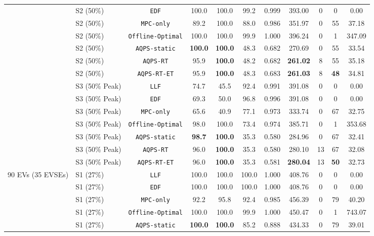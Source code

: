 \documentclass[final,3p,times,twocolumn]{elsarticle}
\begin{document}
\begin{table}[htbp]
\begin{tabular}{llccccccccc}
 & S2 (50\%) & \texttt{EDF}             & 100.0 & 100.0 & 99.2  & 0.999 & 393.00 & 0  & 0  & 0.00  \\
 & S2 (50\%) & \texttt{MPC-only}        & 89.2  & 100.0 & 88.0  & 0.986 & 351.97 & 0  & 55 & 37.18 \\
 & S2 (50\%) & \texttt{Offline-Optimal} & 100.0 & 100.0 & 99.9  & 1.000 & 396.24 & 0  & 1  & 347.09 \\
 & S2 (50\%) & \texttt{AQPS-static}     & \textbf{100.0} & \textbf{100.0} & 48.3  & 0.682 & 270.69 & 0  & 55 & 33.54 \\
 & S2 (50\%) & \texttt{AQPS-RT}         & 95.9  & \textbf{100.0} & 48.2  & 0.682 & \textbf{261.02} & 8  & 55 & 35.18 \\
 & S2 (50\%) & \texttt{AQPS-RT-ET}      & 95.9  & \textbf{100.0} & 48.3  & 0.683 & \textbf{261.03} & 8  & \textbf{48} & 34.81 \\
\cmidrule{2-11}
 & S3 (50\% Peak) & \texttt{LLF}        & 74.7  & 45.5  & 92.4  & 0.991 & 391.08 & 0  & 0  & 0.00  \\
 & S3 (50\% Peak) & \texttt{EDF}        & 69.3  & 50.0  & 96.8  & 0.996 & 391.08 & 0  & 0  & 0.00  \\
 & S3 (50\% Peak) & \texttt{MPC-only}   & 65.6  & 40.9  & 77.1  & 0.973 & 333.74 & 0  & 67 & 32.75 \\
 & S3 (50\% Peak) & \texttt{Offline-Optimal} & 98.0 & 100.0 & 73.4 & 0.974 & 385.71 & 0  & 1  & 353.68 \\
 & S3 (50\% Peak) & \texttt{AQPS-static}& \textbf{98.7}  & \textbf{100.0} & 35.3  & 0.580 & 284.96 & 0  & 67 & 32.41 \\
 & S3 (50\% Peak) & \texttt{AQPS-RT}    & 96.0  & \textbf{100.0} & 35.3  & 0.580 & 280.10 & 13 & 67 & 32.08 \\
 & S3 (50\% Peak) & \texttt{AQPS-RT-ET} & 96.0  & \textbf{100.0} & 35.3  & 0.581 & \textbf{280.04} & 13 & \textbf{50} & 32.73 \\
\midrule
\multirow{21}{*}{90 EVs (35 EVSEs)} 
 & S1 (27\%) & \texttt{LLF}             & 100.0 & 100.0 & 100.0 & 1.000 & 408.76 & 0  & 0  & 0.00  \\
 & S1 (27\%) & \texttt{EDF}             & 100.0 & 100.0 & 100.0 & 1.000 & 408.76 & 0  & 0  & 0.00  \\
 & S1 (27\%) & \texttt{MPC-only}        & 92.2  & 95.8  & 92.4  & 0.985 & 456.39 & 0  & 79 & 40.20 \\
 & S1 (27\%) & \texttt{Offline-Optimal} & 100.0 & 100.0 & 99.9  & 1.000 & 450.47 & 0  & 1  & 743.07 \\
 & S1 (27\%) & \texttt{AQPS-static}     & \textbf{100.0} & \textbf{100.0} & 85.2  & 0.888 & 434.33 & 0  & 79 & 39.01 \\

\end{tabular}
\end{table}
\end{document}
